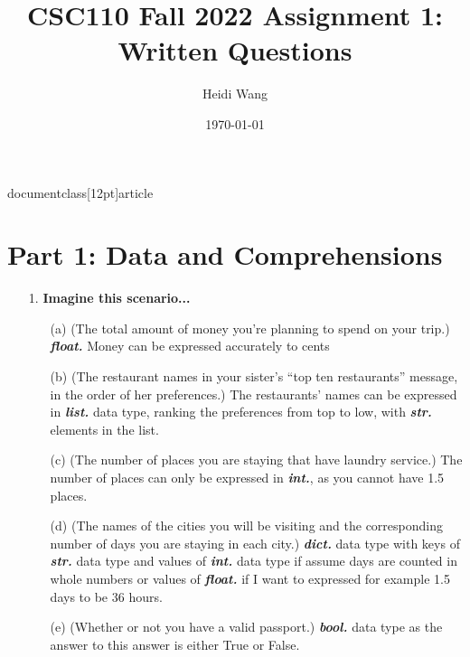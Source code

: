 documentclass[12pt]{article}
\usepackage[utf8]{inputenc}
\usepackage[margin=0.75in]{geometry}

\title{CSC110 Fall 2022 Assignment 1: Written Questions}
\author{Heidi Wang}
\date{\today}


\maketitle

\section*{Part 1: Data and Comprehensions}

\begin{enumerate}
\item[1.] \textbf{Imagine this scenario...}
\begin{enumerate}

\item[(a)] (The total amount of money you're planning to spend on your trip.)
\textit{\textbf{float.}} Money can be expressed accurately to cents

\item[(b)] (The restaurant names in your sister's ``top ten restaurants'' message, in the order of her preferences.)
The restaurants' names can be expressed in \textit{\textbf{list.}} data type, ranking the preferences from top to low, with \textit{\textbf{str.}} elements in the list.

\item[(c)] (The number of places you are staying that have laundry service.)
The number of places can only be expressed in \textit{\textbf{int.}}, as you cannot have 1.5 places.

\item[(d)] (The names of the cities you will be visiting and the corresponding number of days you are staying in each city.)
\textit{\textbf{dict.}} data type with keys of \textit{\textbf{str.}} data type and values of \textit{\textbf{int.}} data type if assume days are counted in whole numbers or values of \textit{\textbf{float.}} if I want to expressed for example 1.5 days to be 36 hours.

\item[(e)] (Whether or not you have a valid passport.)
\textit{\textbf{bool.}} data type as the answer to this answer is either True or False.


\end{enumerate}


\end{enumerate}
